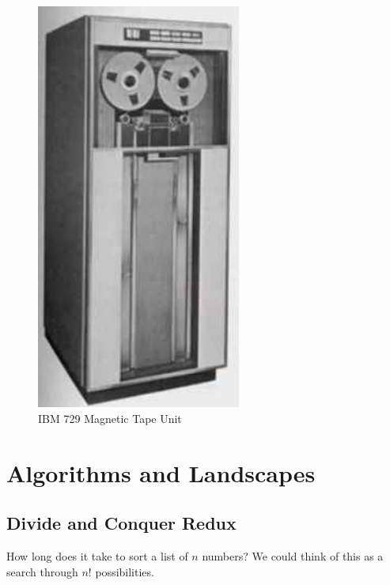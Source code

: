 \documentclass[]{article}
\begin{document}
\begin{figure}[H]
	\begin{center}
		\caption{IBM 729 Magnetic Tape Unit}\label{fig:imb729mtu}
		\includegraphics[width=0.6\textwidth]{imb729mtu}
	\end{center}
\end{figure}
\section{Algorithms and Landscapes}
\cite[Chapter 2]{moore2011nature}

\subsection{Divide and Conquer Redux}

How long does it take to sort a list of $n$ numbers? We could think of this as a search through $n!$ possibilities.
\end{document}
